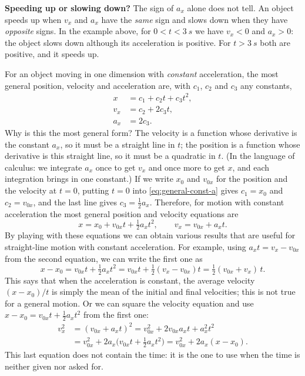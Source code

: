 \documentclass[11pt,a4paper]{article}
\begin{document}
\begin{keyresult}
\textbf{Speeding up or slowing down?} The sign of $a_x$ alone does not tell. An object speeds up
when $v_x$ and $a_x$ have the \emph{same} sign and slows down when they have \emph{opposite} signs.
In the example above, for $0 < t < \qty{3}{s}$ we have $v_x < 0$ and $a_x > 0$: the object slows
down although its acceleration is positive. For $t > \qty{3}{s}$ both are positive, and it speeds
up.
\end{keyresult}

For an object moving in one dimension with \emph{constant} acceleration, the most general position,
velocity and acceleration are, with $c_1$, $c_2$ and $c_3$ any constants,
\begin{equation}\label{eq:general-const-a}
\begin{aligned}
  x   &= c_1 + c_2 t + c_3 t^2 , \\
  v_x &= c_2 + 2c_3 t , \\
  a_x &= 2c_3 .
\end{aligned}
\end{equation}
Why is this the most general form? The velocity is a function whose derivative is the constant
$a_x$, so it must be a straight line in $t$; the position is a function whose derivative is this
straight line, so it must be a quadratic in $t$. (In the language of calculus: we integrate $a_x$
once to get $v_x$ and once more to get $x$, and each integration brings in one constant.) If we
write $x_0$ and $v_{0x}$ for the position and the velocity at $t = 0$, putting $t = 0$ into
\eqref{eq:general-const-a} gives $c_1 = x_0$ and $c_2 = v_{0x}$, and the last line gives
$c_3 = \tfrac12 a_x$. Therefore, for motion with constant acceleration the most general position
and velocity equations are
\begin{equation}\label{eq:const-a}
  x = x_0 + v_{0x}t + \tfrac12 a_x t^2 , \qquad v_x = v_{0x} + a_x t .
\end{equation}
By playing with these equations we can obtain various results that are useful for straight-line
motion with constant acceleration. For example, using $a_x t = v_x - v_{0x}$ from the second
equation, we can write the first one as
\begin{equation}\label{eq:const-a-avg}
  x - x_0 = v_{0x}t + \tfrac12 a_x t^2 = v_{0x}t + \tfrac12 (v_x - v_{0x})t
          = \tfrac12 (v_{0x} + v_x)\,t .
\end{equation}
This says that when the acceleration is constant, the average velocity $(x - x_0)/t$ is simply the
mean of the initial and final velocities; this is not true for a general motion. Or we can square
the velocity equation and use $x - x_0 = v_{0x}t + \tfrac12 a_x t^2$ from the first one:
\begin{equation}\label{eq:const-a-v2}
\begin{split}
  v_x^2 &= (v_{0x} + a_x t)^2 = v_{0x}^2 + 2v_{0x}a_x t + a_x^2 t^2 \\
        &= v_{0x}^2 + 2a_x\bigl(v_{0x}t + \tfrac12 a_x t^2\bigr) = v_{0x}^2 + 2a_x (x - x_0) .
\end{split}
\end{equation}
This last equation does not contain the time: it is the one to use when the time is neither given
nor asked for.
\end{document}
